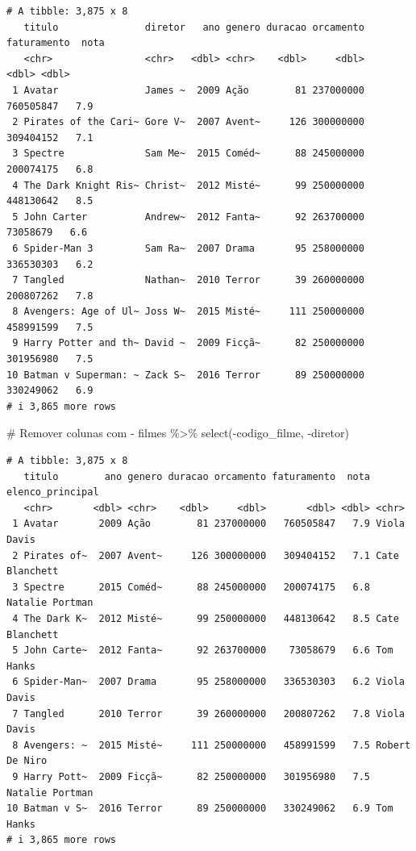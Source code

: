 \documentclass[
  letterpaper,
]{scrbook}
\newenvironment{Shaded}{\begin{snugshade}}{\end{snugshade}}
\newcommand{\CommentTok}[1]{\textcolor[rgb]{0.37,0.37,0.37}{#1}}
\newcommand{\FunctionTok}[1]{\textcolor[rgb]{0.28,0.35,0.67}{#1}}
\newcommand{\NormalTok}[1]{\textcolor[rgb]{0.00,0.23,0.31}{#1}}
\newcommand{\SpecialCharTok}[1]{\textcolor[rgb]{0.37,0.37,0.37}{#1}}
\begin{document}
\begin{verbatim}
# A tibble: 3,875 x 8
   titulo               diretor   ano genero duracao orcamento faturamento  nota
   <chr>                <chr>   <dbl> <chr>    <dbl>     <dbl>       <dbl> <dbl>
 1 Avatar               James ~  2009 Ação        81 237000000   760505847   7.9
 2 Pirates of the Cari~ Gore V~  2007 Avent~     126 300000000   309404152   7.1
 3 Spectre              Sam Me~  2015 Coméd~      88 245000000   200074175   6.8
 4 The Dark Knight Ris~ Christ~  2012 Misté~      99 250000000   448130642   8.5
 5 John Carter          Andrew~  2012 Fanta~      92 263700000    73058679   6.6
 6 Spider-Man 3         Sam Ra~  2007 Drama       95 258000000   336530303   6.2
 7 Tangled              Nathan~  2010 Terror      39 260000000   200807262   7.8
 8 Avengers: Age of Ul~ Joss W~  2015 Misté~     111 250000000   458991599   7.5
 9 Harry Potter and th~ David ~  2009 Ficçã~      82 250000000   301956980   7.5
10 Batman v Superman: ~ Zack S~  2016 Terror      89 250000000   330249062   6.9
# i 3,865 more rows
\end{verbatim}

\begin{Shaded}
\begin{Highlighting}[]
\CommentTok{\# Remover colunas com {-}}
\NormalTok{filmes }\SpecialCharTok{\%\textgreater{}\%} 
  \FunctionTok{select}\NormalTok{(}\SpecialCharTok{{-}}\NormalTok{codigo\_filme, }\SpecialCharTok{{-}}\NormalTok{diretor)}
\end{Highlighting}
\end{Shaded}

\begin{verbatim}
# A tibble: 3,875 x 8
   titulo        ano genero duracao orcamento faturamento  nota elenco_principal
   <chr>       <dbl> <chr>    <dbl>     <dbl>       <dbl> <dbl> <chr>           
 1 Avatar       2009 Ação        81 237000000   760505847   7.9 Viola Davis     
 2 Pirates of~  2007 Avent~     126 300000000   309404152   7.1 Cate Blanchett  
 3 Spectre      2015 Coméd~      88 245000000   200074175   6.8 Natalie Portman 
 4 The Dark K~  2012 Misté~      99 250000000   448130642   8.5 Cate Blanchett  
 5 John Carte~  2012 Fanta~      92 263700000    73058679   6.6 Tom Hanks       
 6 Spider-Man~  2007 Drama       95 258000000   336530303   6.2 Viola Davis     
 7 Tangled      2010 Terror      39 260000000   200807262   7.8 Viola Davis     
 8 Avengers: ~  2015 Misté~     111 250000000   458991599   7.5 Robert De Niro  
 9 Harry Pott~  2009 Ficçã~      82 250000000   301956980   7.5 Natalie Portman 
10 Batman v S~  2016 Terror      89 250000000   330249062   6.9 Tom Hanks       
# i 3,865 more rows
\end{verbatim}
\end{document}
